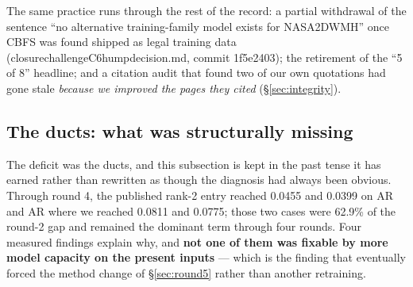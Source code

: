 \documentclass[11pt,a4paper]{article}
\newcommand{\breakus}{\textunderscore\allowbreak}
\newcommand{\code}[1]{{\small\ttfamily\let\_\breakus #1}}
\newcommand{\artifact}[1]{{\footnotesize\ttfamily\let\_\breakus #1}}
\begin{document}
The same practice runs through the rest of the record: a partial withdrawal of the sentence
``no alternative training-family model exists for \code{NASA\_2DWMH}'' once CBFS was found
shipped as legal training data
(\artifact{closure\_challenge\_C6\_hump\_decision.md}, commit
\code{1f5e2403}); the retirement of the ``5 of 8'' headline; and a citation audit that
found two of our own quotations had gone stale \emph{because we improved the pages they
cited} (\S\ref{sec:integrity}).

\subsection{The ducts: what was structurally missing}
\label{sec:ductmissing}

The deficit was the ducts, and this subsection is kept in the past tense it has earned
rather than rewritten as though the diagnosis had always been obvious. Through round 4, the
published rank-2 entry reached 0.0455 and 0.0399 on \code{AR\_1} and \code{AR\_3} where we
reached 0.0811 and 0.0775; those two cases were 62.9\% of the round-2 gap and remained the
dominant term through four rounds. Four measured findings explain why, and \textbf{not one
of them was fixable by more model capacity on the present inputs} --- which is the finding
that eventually forced the method change of \S\ref{sec:round5} rather than another
retraining.
\end{document}
